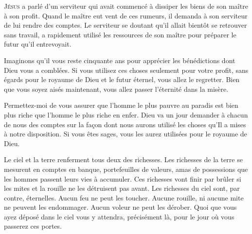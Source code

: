 \dvrule







\lettrine{J}{ésus} a parlé d'un serviteur qui avait commencé
 à dissiper les biens de son maître à son profit.
 Quand le maître eut vent de ces rumeurs, il demanda à son serviteur
 de lui rendre des comptes. Le serviteur se doutant qu'il allait bientôt
 se retrouver sans travail, a rapidement utilisé les ressources
 de son maître pour préparer le futur qu'il entrevoyait.

Imaginons qu'il vous reste cinquante ans pour apprécier les bénédictions
 dont Dieu vous a comblées. Si vous utilisez ces choses seulement
 pour votre profit, sans égards pour le royaume de Dieu et le futur éternel,
 vous allez le regretter. Bien que vous soyez aisés maintenant,
 vous allez passer l'éternité dans la misère.

Permettez-moi de vous assurer que l'homme le plus pauvre au paradis
 est bien plus riche que l'homme le plus riche en enfer.
 Dieu va un jour demander à chacun de nous des comptes
 sur la fa\c{c}on dont nous aurons utilisé les choses qu'Il a mises
 à notre disposition. Si vous êtes sages,
 vous les aurez utilisées pour le royaume de Dieu.

Le ciel et la terre renferment tous deux des richesses.
 Les richesses de la terre se mesurent en comptes en banque,
 portefeuilles de valeurs, amas de possessions que les hommes passent
 leurs vies à accumuler. Ces richesses vont finir par brûler si les mites
 et la rouille ne les détruisent pas avant. Les richesses du ciel sont,
 par contre, éternelles. Aucun feu ne peut les toucher.
 Aucune rouille, ni aucune mite ne peuvent les endommager.
 Aucun voleur ne peut les dérober. Quoi que vous ayez déposé dans le ciel
 vous y attendra, précisément là, pour le jour où vous passerez ces portes.

